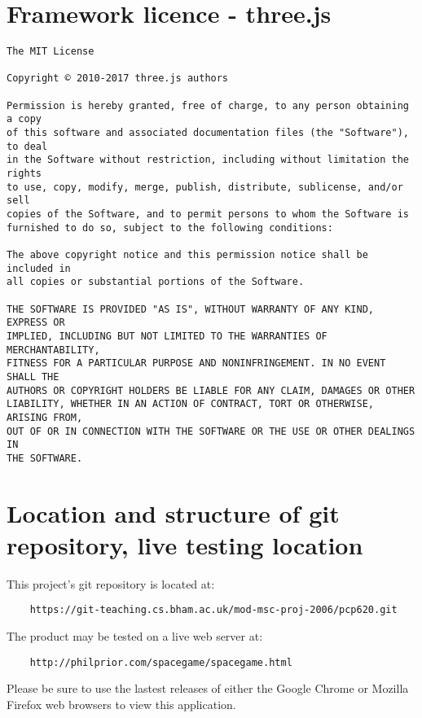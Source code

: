 \documentclass[twoside]{bhamthesis}
\begin{document}
\newpage

\section{Framework licence - three.js}

\begin{verbatim}
The MIT License

Copyright © 2010-2017 three.js authors

Permission is hereby granted, free of charge, to any person obtaining a copy
of this software and associated documentation files (the "Software"), to deal
in the Software without restriction, including without limitation the rights
to use, copy, modify, merge, publish, distribute, sublicense, and/or sell
copies of the Software, and to permit persons to whom the Software is
furnished to do so, subject to the following conditions:

The above copyright notice and this permission notice shall be included in
all copies or substantial portions of the Software.

THE SOFTWARE IS PROVIDED "AS IS", WITHOUT WARRANTY OF ANY KIND, EXPRESS OR
IMPLIED, INCLUDING BUT NOT LIMITED TO THE WARRANTIES OF MERCHANTABILITY,
FITNESS FOR A PARTICULAR PURPOSE AND NONINFRINGEMENT. IN NO EVENT SHALL THE
AUTHORS OR COPYRIGHT HOLDERS BE LIABLE FOR ANY CLAIM, DAMAGES OR OTHER
LIABILITY, WHETHER IN AN ACTION OF CONTRACT, TORT OR OTHERWISE, ARISING FROM,
OUT OF OR IN CONNECTION WITH THE SOFTWARE OR THE USE OR OTHER DEALINGS IN
THE SOFTWARE.
\end{verbatim}

\section{Location and structure of git repository, live testing location}

This project's git repository is located at:
\begin{verbatim}
	https://git-teaching.cs.bham.ac.uk/mod-msc-proj-2006/pcp620.git
\end{verbatim}

The product may be tested on a live web server at:
\begin{verbatim}
	http://philprior.com/spacegame/spacegame.html
\end{verbatim}
Please be sure to use the lastest releases of either the Google Chrome or Mozilla Firefox web browsers to view this application.


\declaration
\end{document}
